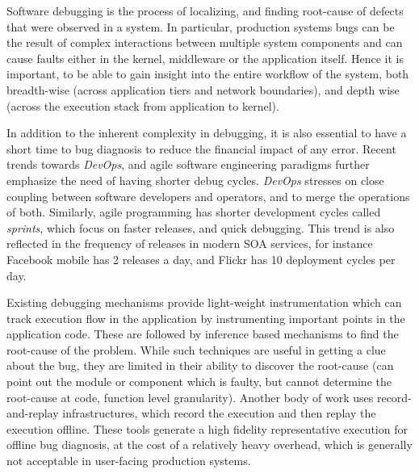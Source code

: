 Software debugging is the process of localizing, and finding root-cause of defects that were observed in a system.
In particular, production systems bugs can be the result of complex interactions between multiple system components and can cause faults either in the kernel, middleware or the application itself.
Hence it is important, to be able to gain insight into the entire workflow of the system, both breadth-wise (across application tiers and network boundaries), and depth wise (across the execution stack from application to kernel).

In addition to the inherent complexity in debugging, it is also essential to have a short time to bug diagnosis to reduce the financial impact of any error.
Recent trends towards \emph{DevOps}, and agile software engineering paradigms further emphasize the need of having shorter debug cycles.
\emph{DevOps} stresses on close coupling between software developers and operators, and to merge the operations of both.
Similarly, agile programming has shorter development cycles called \textit{sprints}, which focus on faster releases, and quick debugging.
This trend is also reflected in the frequency of releases in modern SOA services, for instance Facebook mobile has 2 releases a day, and Flickr has 10 deployment cycles per day.


Existing debugging mechanisms provide light-weight instrumentation which can track execution flow in the application by instrumenting important points in the application code.
These are followed by inference based mechanisms to find the root-cause of the problem.
While such techniques are useful in getting a clue about the bug, they are limited in their ability to discover the root-cause (can point out the module or component which is faulty, but cannot determine the root-cause at code, function level granularity).
Another body of work uses record-and-replay infrastructures, which record the execution and then replay the execution offline.
These tools generate a high fidelity representative execution for offline bug diagnosis, at the cost of a relatively heavy overhead, which is generally not acceptable in user-facing production systems.


